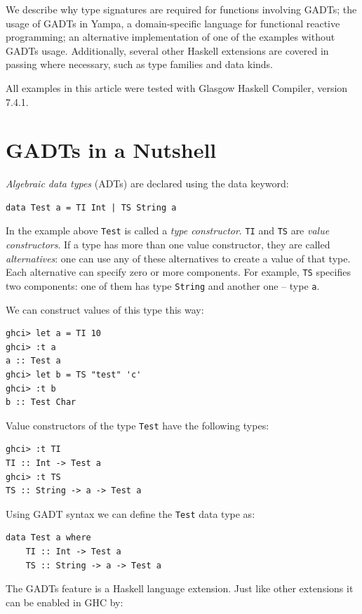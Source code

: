 \documentclass{tmr}
\newcommand{\italic}[1]{\textit{#1}}
\begin{document}
We describe why type signatures are required for functions involving GADTs; the usage of GADTs in Yampa, a domain-specific language for functional reactive programming; an alternative implementation of one of the examples without GADTs usage. Additionally, several other Haskell extensions are covered in passing where necessary, such as type families and data kinds.

All examples in this article were tested with Glasgow Haskell Compiler, version 7.4.1.

\section{GADTs in a Nutshell}
\label{sec:nutshell}

\italic{Algebraic data types} (ADTs) are declared using the data keyword:

\begin{Verbatim}
data Test a = TI Int | TS String a
\end{Verbatim}

In the example above \verb}Test} is called a \italic{type constructor}. \verb|TI| and \verb|TS| are \italic{value constructors}. If a type has more than one value constructor, they are called \italic{alternatives}: one can use any of these alternatives to create a value of that type. Each alternative can specify zero or more components. For example, \verb|TS| specifies two components: one of them has type \verb|String| and another one -- type \verb|a|.

We can construct values of this type this way:

\begin{Verbatim}
ghci> let a = TI 10
ghci> :t a
a :: Test a
ghci> let b = TS "test" 'c'
ghci> :t b
b :: Test Char
\end{Verbatim}

Value constructors of the type \verb|Test| have the following types:

\begin{Verbatim}
ghci> :t TI
TI :: Int -> Test a
ghci> :t TS
TS :: String -> a -> Test a
\end{Verbatim}

Using GADT syntax we can define the \verb|Test| data type as:

\begin{Verbatim}
data Test a where
    TI :: Int -> Test a
    TS :: String -> a -> Test a
\end{Verbatim}

The GADTs feature is a Haskell language extension. Just like other extensions it can be enabled in GHC by:
\end{document}
